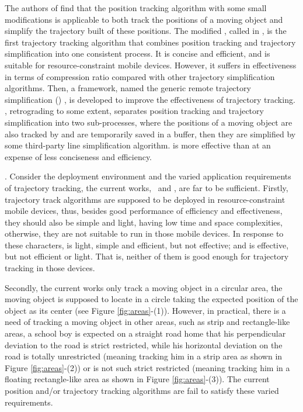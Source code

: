 The authors of \cite{Trajcevski:LDRH} find that the position tracking algorithm \ldr with some small modifications is applicable to both track the positions of a moving object and simplify the trajectory built of these positions. The modified \ldr,  called \ldrh in \cite{Lange:Tracking}, is the first trajectory tracking algorithm that combines position tracking and trajectory simplification into one consistent process. It is concise and efficient, and is suitable for resource-constraint mobile devices. However, it suffers in effectiveness in terms of compression ratio compared with other trajectory simplification algorithms. %
%
Then, a framework, named the generic remote trajectory simplification (\grts) \cite{Lange:GRTS,Lange:Tracking}, is developed to improve the effectiveness of trajectory tracking. \grts, retrograding to some extent, separates position tracking and trajectory simplification into two sub-processes, where the positions of a moving object are also tracked by \ldr and are temporarily saved in a buffer, then they are simplified by some third-party line simplification algorithm. \grts is more effective than \ldrh at an expense of less conciseness and efficiency.
%



. Consider the deployment environment and the varied application requirements of trajectory tracking, the current works, \ie~\ldrh and \grts, are far to be sufficient. Firstly, trajectory track algorithms are supposed to be deployed in resource-constraint mobile devices, thus, besides good performance of efficiency and effectiveness, they should also be simple and light, \ie having low time and space complexities, otherwise, they are not suitable to run in those mobile devices. In response to these characters, \ldrh is light, simple and efficient, but not effective; and \grts is effective, but not efficient or light. That is, neither of them is good enough for trajectory tracking in those devices.

Secondly, the current works only track a moving object in a circular area, \ie the moving object is supposed to locate in a circle taking the expected position of the object as its center (see Figure \ref{fig:areas}-(1)). However, in practical, there is a need of tracking a moving object in other areas, such as strip and rectangle-like areas, \eg a school boy is expected on a straight road home that his perpendicular deviation to the road is strict restricted, while his horizontal deviation on the road is totally unrestricted (meaning tracking him in a strip area as shown in Figure \ref{fig:areas}-(2)) or is not such strict restricted (meaning tracking him in a floating rectangle-like area as shown in Figure \ref{fig:areas}-(3)). The current position and/or trajectory tracking algorithms are fail to satisfy these varied requirements.



